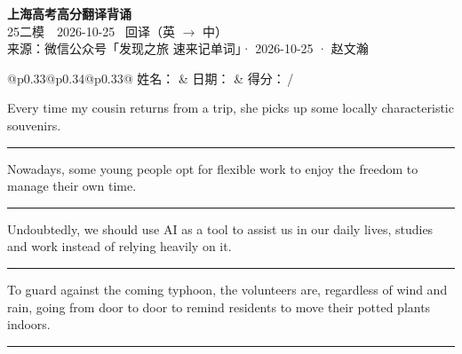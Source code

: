\documentclass[11pt,a4paper]{article}
\newcommand{\num}[1]{\makebox[1.9em][r]{#1.}\hspace{0.3em}}
\newcommand{\wline}{\noindent\rule{\linewidth}{0.4pt}}
\begin{document}
\pagestyle{plain}
\begin{center}
{\LARGE\bfseries 上海高考高分翻译背诵 }\\[0.25em]
{\large 25二模　2026-10-25 \quad\ 回译（英 $\to$ 中）}\\[0.35em]
{\footnotesize 来源：微信公众号「发现之旅 速来记单词」· 2026-10-25 · 赵文瀚}
\end{center}

\vspace{0.4em}
\noindent\begin{tabular}{@{}p{0.33\textwidth}@{}p{0.34\textwidth}@{}p{0.33\textwidth}@{}}
姓名：\underline{\hspace{2.0cm}} & 日期：\underline{\hspace{2.0cm}} & 得分：\underline{\hspace{1.4cm}}\,/ \\
\end{tabular}

\vspace{0.5em}

\vspace{0.8em}
\num{1}Every time my cousin returns from a trip, she picks up some locally characteristic souvenirs.

\vspace{0.25em}

\wline

\num{2}Nowadays, some young people opt for flexible work to enjoy the freedom to manage their own time.

\vspace{0.25em}

\wline

\num{3}Undoubtedly, we should use AI as a tool to assist us in our daily lives, studies and work instead of relying heavily on it.

\vspace{0.25em}

\wline

\num{4}To guard against the coming typhoon, the volunteers are, regardless of wind and rain, going from door to door to remind residents to move their potted plants indoors.

\vspace{0.25em}

\wline
\end{document}
